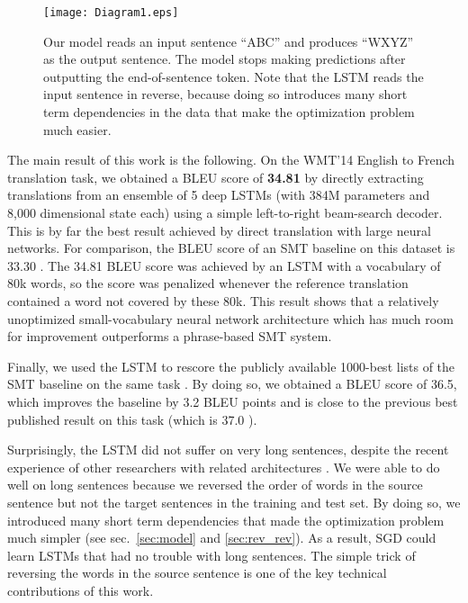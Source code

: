 \documentclass{article} \usepackage{nips14submit_e}
\begin{document}
\begin{figure}[h]
\centering \texttt{[image: Diagram1.eps]}
\caption{\small Our model reads an input sentence ``ABC'' and produces
  ``WXYZ'' as the output sentence.  The model stops making predictions
  after outputting the end-of-sentence token.  Note that the LSTM
  reads the input sentence in reverse, because doing so introduces
  many short term dependencies in the data that make the optimization
  problem much easier. }
\label{fig:translation-model2}
\end{figure}

The main result of this work is the following.  On the WMT'14 English
to French translation task, we obtained a BLEU score of {\bf 34.81} by
directly extracting translations from an ensemble of 5 deep LSTMs
(with 384M parameters and 8,000 dimensional state each) using a simple left-to-right beam-search
decoder.  This is by far the best result achieved by direct
translation with large neural networks.  For comparison, the BLEU
score of an SMT baseline on
this dataset is 33.30 \cite{wmt14_en_fr}.  The
34.81 BLEU score was achieved by an LSTM with a vocabulary of 80k
words, so the score was penalized whenever the reference translation
contained a word not covered by these 80k.  This result shows that a
relatively unoptimized small-vocabulary neural network architecture which has much room
for improvement outperforms a phrase-based SMT system.

Finally, we used the LSTM to rescore the publicly available 1000-best
lists of the SMT baseline on the same task \cite{wmt14_en_fr}.  By
doing so, we obtained a BLEU score of 36.5, which improves the
baseline by 3.2 BLEU points and is close to the previous best published
result on this task (which is 37.0 \cite{durrani-EtAl:2014:W14-33}).

Surprisingly, the LSTM did not suffer on very long sentences, despite
the recent experience of other researchers with related architectures
\cite{curse}.  We were able to do well on long sentences because we
reversed the order of words in the source sentence but not the target
sentences in the training and test set. By doing so, we introduced
many short term dependencies that made the optimization problem much
simpler (see sec.~\ref{sec:model} and \ref{sec:rev_rev}).  As a result, SGD could learn
LSTMs that had no trouble with long sentences.  The simple trick of
reversing the words in the source sentence is one of the key technical
contributions of this work.
 
\end{document}
